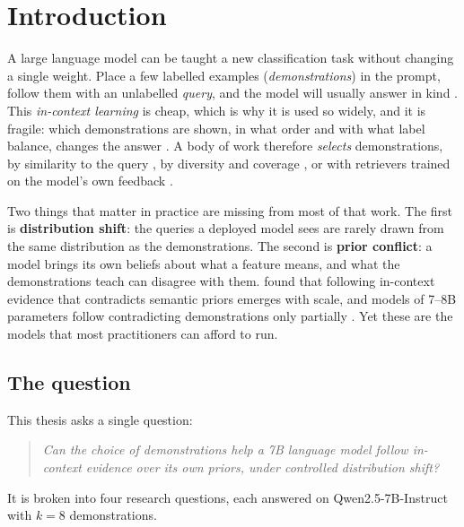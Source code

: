 \chapter{Introduction}
\label{ch:intro}

A large language model can be taught a new classification task without changing a single weight.
Place a few labelled examples (\emph{demonstrations}) in the prompt, follow them with an unlabelled \emph{query}, and the model will usually answer in kind \citep{brown2020language,dong2024survey}.
This \emph{in-context learning} is cheap, which is why it is used so widely, and it is fragile: which demonstrations are shown, in what order and with what label balance, changes the answer \citep{zhao2021calibrate,lu2022fantastically,min2022rethinking}.
A body of work therefore \emph{selects} demonstrations, by similarity to the query \citep{liu2022what}, by diversity and coverage \citep{levy2023diverse,gupta2023coverage}, or with retrievers trained on the model's own feedback \citep{rubin2022learning,li2023unified,ye2023compositional}.

Two things that matter in practice are missing from most of that work.
The first is \textbf{distribution shift}: the queries a deployed model sees are rarely drawn from the same distribution as the demonstrations.
The second is \textbf{prior conflict}: a model brings its own beliefs about what a feature means, and what the demonstrations teach can disagree with them.
\citet{wei2023larger} found that following in-context evidence that contradicts semantic priors emerges with scale, and models of 7--8B parameters follow contradicting demonstrations only partially \citep{krishnakumar2025semantic,kossen2024incontext}.
Yet these are the models that most practitioners can afford to run.

\section{The question}

This thesis asks a single question:

\begin{quote}
\textit{Can the choice of demonstrations help a 7B language model follow in-context evidence over its own priors, under controlled distribution shift?}
\end{quote}

It is broken into four research questions, each answered on Qwen2.5-7B-Instruct \citep{qwen2024qwen25} with $k = 8$ demonstrations.

